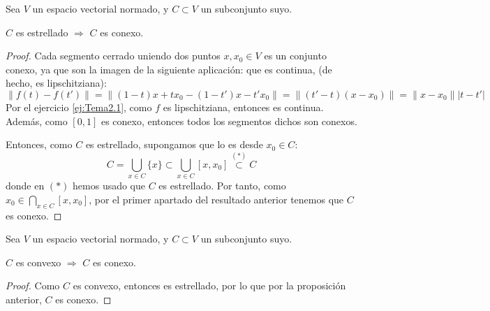 \begin{prop}
    Sea $V$ un espacio vectorial normado, y $C\subset V$ un subconjunto suyo.
    \begin{center}
        $C$ es estrellado $\Longrightarrow$ $C$ es conexo.
    \end{center}
\end{prop}
\begin{proof} 
    Cada segmento cerrado uniendo dos puntos $x,x_0\in V$ es un conjunto conexo, ya que son la imagen de la siguiente aplicación:
    que es continua, (de hecho, es lipschitziana):
    \begin{equation*}
        \|f(t)-f(t')\|=\|(1-t)x+tx_0-(1-t')x-t'x_0\|=\|(t'-t)(x-x_0)\|=\|x-x_0\||t-t'|
    \end{equation*}
    Por el ejercicio \ref{ej:Tema2.1}, como $f$ es lipschitziana, entonces es continua. Además, como $[0,1]$ es conexo, entonces todos los segmentos dichos son conexos.

    Entonces, como $C$ es estrellado, supongamos que lo es desde $x_0\in C$:
    \begin{equation*}
        C = \bigcup_{x\in C}\{x\} \subset \bigcup_{x\in C}[x,x_0] \stackrel{(\ast)}{\subset} C
    \end{equation*}
    donde en $(\ast)$ hemos usado que $C$ es estrellado. Por tanto, como $x_0\in \bigcap\limits_{x\in C}[x,x_0]$, por el primer apartado del resultado anterior tenemos que $C$ es conexo.
\end{proof}
\begin{coro}
    Sea $V$ un espacio vectorial normado, y $C\subset V$ un subconjunto suyo.
    \begin{center}
        $C$ es convexo $\Longrightarrow$ $C$ es conexo.
    \end{center}
\end{coro}
\begin{proof}
    Como $C$ es convexo, entonces es estrellado, por lo que por la proposición anterior, $C$ es conexo.
\end{proof}

